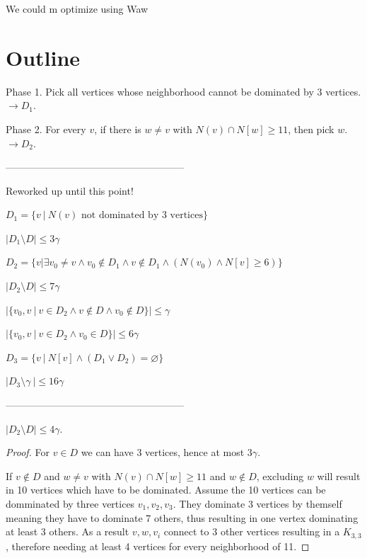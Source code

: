 We could m optimize using Waw


\section{Outline}


Phase 1. Pick all vertices whose neighborhood cannot be dominated by $3$
vertices. $\rightarrow D_1$. 

\bigskip
Phase 2. For every $v$, if there is $w\neq v$ with $N(v)\cap N[w]\geq 11$, 
then pick $w$. $\rightarrow D_2$.

------------------------------------------------------

Reworked up until this point!

$D_1 = \{ v \> | \> N(v) \text{ not dominated by 3 vertices} \}$

$|D_1 \setminus D| \leq 3\gamma$

$D_2 = \{v|\exists v_0 \neq v \land v_0 \notin D_1 \land v \notin D_1 \land (N(v_0) \land N[v] \geq 6)\}$

\begin{lemma}
$|D_2 \setminus D | \leq 7 \gamma$

$|\{v_0, v \> | \> v \in D_2 \land v \notin D \land v_0 \notin D \}| \leq \gamma$

$|\{ v_0, v \> | \> v \in D_2 \land v_0 \in D\} |  \leq 6 \gamma$
\end{lemma}

\begin{lemma}
$D_3 = \{ v \> | \> N[v] \land (D_1 \lor D_2) = \varnothing \} $

$|D_3 \setminus \gamma \> | \leq 16 \gamma$
\end{lemma}
















------------------------------------------------------
\begin{lemma}
$|D_2\setminus D|\leq 4\gamma$.
\end{lemma}
\begin{proof}
For $v\in D$ we can have $3$ vertices, hence at most $3\gamma$. 

If $v\not\in D$ and $w\neq v$ with $N(v)\cap N[w]\geq 11$ and $w\not\in D$,
excluding $w$ will result in 10 vertices which have to be dominated. 
Assume the 10 vertices can be domminated by three vertices $v_1, v_2, v_3$.
They dominate 3 vertices by themself meaning they have to dominate 7 others, 
thus resulting in one vertex dominating at least 3 others. 
As a result $v, w, v_i$ connect to 3 other vertices resulting in a $K_{3,3}$, therefore needing at least 4 vertices for every neighborhood of 11.
\end{proof}

